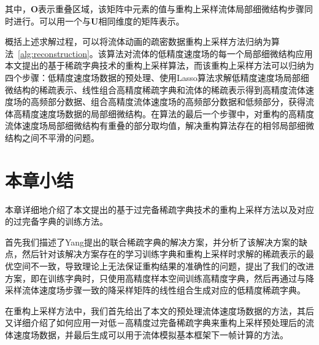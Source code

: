 其中，$\boldsymbol O$表示重叠区域，该矩阵中元素的值与重构上采样流体局部细微结构步骤同时进行。可以用一个与$\boldsymbol U$相同维度的矩阵表示。

概括上述求解过程，可以将流体动画的疏密数据重构上采样方法归纳为算法~\ref{alg:reconstruction}。该算法对流体的低精度速度场的每一个局部细微结构应用本文提出的基于稀疏字典技术的重构上采样算法，而该重构上采样方法可以归纳为四个步骤：低精度速度场数据的预处理、使用Lasso算法求解低精度速度场局部细微结构的稀疏表示、线性组合高精度稀疏字典和流体的稀疏表示得到高精度流体速度场的高频部分数据、组合高精度流体速度场的高频部分数据和低频部分，获得流体高精度速度场数据的局部细微结构。在算法的最后一个步骤中，对重构的高精度流体速度场局部细微结构有重叠的部分取均值，解决重构算法存在的相邻局部细微结构之间不平滑的问题。


\section{本章小结}

本章详细地介绍了本文提出的基于过完备稀疏字典技术的重构上采样方法以及对应的过完备字典的训练方法。

首先我们描述了Yang提出的联合稀疏字典的解决方案，并分析了该解决方案的缺点，然后针对该解决方案存在的学习训练字典和重构上采样时求解的稀疏表示的最优空间不一致，导致理论上无法保证重构结果的准确性的问题，提出了我们的改进方案，即在训练字典时，只使用高精度样本空间训练高精度字典，然后再通过与降采样流体速度场步骤一致的降采样矩阵的线性组合生成对应的低精度稀疏字典。

在重构上采样方法中，我们首先给出了本文的预处理流体速度场数据的方法，其后又详细介绍了如何应用一对低－高精度过完备稀疏字典来重构上采样预处理后的流体速度场数据，并最后生成可以用于流体模拟基本框架下一帧计算的方法。
